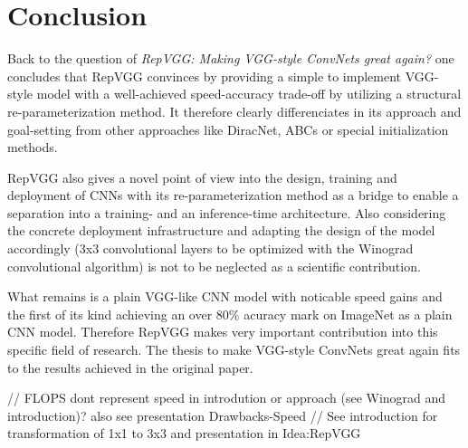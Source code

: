 \section{Conclusion} \label{conclusion}

Back to the question of \textit{RepVGG: Making VGG-style ConvNets great again?} one concludes that RepVGG convinces by providing a simple to implement VGG-style model with a well-achieved speed-accuracy trade-off by utilizing a structural re-parameterization method. It therefore clearly differenciates in its approach and goal-setting from other approaches like DiracNet, ABCs or special initialization methods. 

RepVGG also gives a novel point of view into the design, training and deployment of CNNs with its re-parameterization method as a bridge to enable a separation into a training- and an inference-time architecture. Also considering the concrete deployment infrastructure and adapting the design of the model accordingly (3x3 convolutional layers to be optimized with the Winograd convolutional algorithm) is not to be neglected as a scientific contribution. 

What remains is a plain VGG-like CNN model with noticable speed gains and the first of its kind achieving an over 80\% acuracy mark on ImageNet \cite{JiaDeng.2009} as a plain CNN model. Therefore RepVGG makes very important contribution into this specific field of research. The thesis to make VGG-style ConvNets great again fits to the results achieved in the original paper. 



// FLOPS dont represent speed in introdution or approach (see Winograd and introduction)? also see presentation Drawbacks-Speed
// See introduction for transformation of 1x1 to 3x3 and presentation in Idea:RepVGG